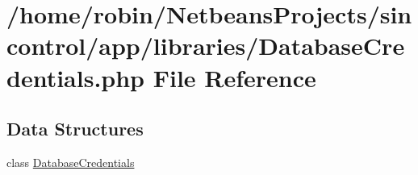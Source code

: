 \hypertarget{_database_credentials_8php}{}\section{/home/robin/\+Netbeans\+Projects/sincontrol/app/libraries/\+Database\+Credentials.php File Reference}
\label{_database_credentials_8php}
\subsection*{Data Structures}
\begin{DoxyCompactItemize}
\item 
class \hyperlink{class_database_credentials}{Database\+Credentials}
\end{DoxyCompactItemize}
